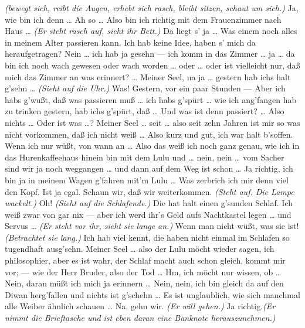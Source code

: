 \documentclass[
	final,
	a4paper,
	ngerman,
	mpinclude = true, %
	twoside = true,
	open = right,
	cleardoublepage = plain,
	DIV = 13,
	BCOR = 1cm,
	titlepage = firstiscover,
	]{scrbook}
\newcommand{\direction}[1]{\textit{(#1)}}
\newcommand{\thecharacter}[1]{\textup{\textsc{#1}}}
\newcommand{\thegraf}{\thecharacter{Graf}}
\newcommand{\character}[1]{\item[#1:]}
\newcommand{\graf}{\character{\thegraf}}
\begin{document}
\begin{play}
	\graf
	\direction{bewegt sich, reibt die Augen, erhebt sich rasch, bleibt sitzen, schaut um sich.} Ja, wie bin ich denn \ldots{} Ah so \ldots{} Also bin ich richtig mit dem Frauenzimmer nach Haus \ldots{} \direction{Er steht rasch auf, sieht ihr Bett.} Da liegt s' ja \ldots{} Was einem noch alles in meinem Alter passieren kann. Ich hab keine Idee, haben s' mich da heraufgetragen? Nein \ldots{} ich hab ja gesehn --- ich komm in das Zimmer \ldots{} ja \ldots{} da bin ich noch wach gewesen oder wach worden \ldots{} oder \ldots{} oder ist vielleicht nur, daß mich das Zimmer an was erinnert? \ldots{} Meiner Seel, na ja \ldots{} gestern hab ichs halt g'sehn \ldots{} \direction{Sieht auf die Uhr.} Was! Gestern, vor ein paar Stunden --- Aber ich habs g'wußt, daß was passieren muß \ldots{} ich habs g'spürt \ldots{} wie ich ang'fangen hab zu trinken gestern, hab ichs g'spürt, daß \ldots{} Und was ist denn passiert? \ldots{} Also nichts \ldots{} Oder ist was \ldots{}? Meiner Seel \ldots{} seit \ldots{} also seit zehn Jahren ist mir so was nicht vorkommen, daß ich nicht weiß \ldots{} Also kurz und gut, ich war halt b'soffen. Wenn ich nur wüßt, von wann an \ldots{} Also das weiß ich noch ganz genau, wie ich in das Hurenkaffeehaus hinein bin mit dem Lulu und \ldots{} nein, nein \ldots{} vom Sacher sind wir ja noch weggangen \ldots{} und dann auf dem Weg ist schon \ldots{} Ja richtig, ich bin ja in meinem Wagen g'fahren mit'm Lulu \ldots{} Was zerbrich ich mir denn viel den Kopf. Ist ja egal. Schaun wir, daß wir weiterkommen. \direction{Steht auf. Die Lampe wackelt.} Oh! \direction{Sieht auf die Schlafende.} Die hat halt einen g'sunden Schlaf. Ich weiß zwar von gar nix --- aber ich werd ihr's Geld aufs Nachtkastel legen \ldots{} und Servus \ldots{} \direction{Er steht vor ihr, sieht sie lange an.} Wenn man nicht wüßt, was sie ist! \direction{Betrachtet sie lang.} Ich hab viel kennt, die haben nicht einmal im Schlafen so tugendhaft ausg'sehn. Meiner Seel \ldots{} also der Lulu möcht wieder sagen, ich philosophier, aber es ist wahr, der Schlaf macht auch schon gleich, kommt mir vor; --- wie der Herr Bruder, also der Tod \ldots{} Hm, ich möcht nur wissen, ob \ldots{} Nein, daran müßt ich mich ja erinnern \ldots{} Nein, nein, ich bin gleich da auf den Diwan herg'fallen und nichts ist g'schehn \ldots{} Es ist unglaublich, wie sich manchmal alle Weiber ähnlich schauen \ldots{} Na, gehn wir. \direction{Er will gehen.} Ja richtig.\direction{Er nimmt die Brieftasche und ist eben daran eine Banknote herauszunehmen.}


\end{play}
\end{document}
